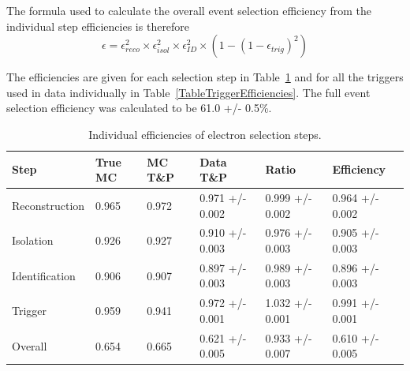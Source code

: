 
The formula used to calculate the overall event selection efficiency 
from the individual step efficiencies is therefore 
\[
\epsilon = \epsilon_{reco}^2 \times \epsilon_{isol}^2 \times \epsilon_{ID}^2 \times \left( 1 - \left( 1 - \epsilon_{trig} \right)^2 \right)
\]


The efficiencies are given for each selection step in Table~\ref{TableEfficiencies} %
and for all the triggers used in data individually in Table~\ref{TableTriggerEfficiencies}.  
The full event selection efficiency was calculated to be 
61.0 +/- 0.5\%.  

\begin{table}[htbp]
  \begin{center}
    \caption{\fixspacing Individual efficiencies of electron selection steps.}
    \label{TableEfficiencies}
    \begin{tabular}[]{ | l | l | l | l | l | l | }
      \hline
      Step & True MC & MC T\&P & Data T\&P & Ratio & Efficiency \\ \hline \hline
      Reconstruction & 0.965 & 0.972 & 0.971 +/- 0.002 & 0.999 +/- 0.002 & 0.964 +/- 0.002 \\ \hline
      Isolation & 0.926 & 0.927 & 0.910 +/- 0.003 & 0.976 +/- 0.003 & 0.905 +/- 0.003 \\ \hline
      Identification & 0.906 & 0.907 & 0.897 +/- 0.003 & 0.989 +/- 0.003 & 0.896 +/- 0.003 \\ \hline
      Trigger & 0.959 & 0.941 & 0.972 +/- 0.001 & 1.032 +/- 0.001 & 0.991 +/- 0.001 \\ \hline \hline
      Overall & 0.654 & 0.665 & 0.621 +/- 0.005 & 0.933 +/- 0.007 & 0.610 +/- 0.005 \\ \hline %
    \end{tabular}
  \end{center}
\end{table}


